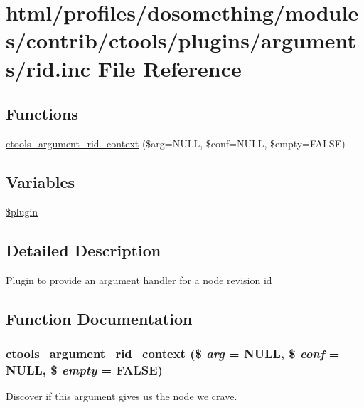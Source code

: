 \hypertarget{rid_8inc}{
\section{html/profiles/dosomething/modules/contrib/ctools/plugins/arguments/rid.inc File Reference}
\label{rid_8inc}
}
\subsection*{Functions}
\begin{DoxyCompactItemize}
\item 
\hyperlink{rid_8inc_a6d6d87b8d7fd2ef4240904fb796906dd}{ctools\_\-argument\_\-rid\_\-context} (\$arg=NULL, \$conf=NULL, \$empty=FALSE)
\end{DoxyCompactItemize}
\subsection*{Variables}
\begin{DoxyCompactItemize}
\item 
\hyperlink{rid_8inc_ada8a7130088351710bb02ed622d6bf65}{\$plugin}
\end{DoxyCompactItemize}


\subsection{Detailed Description}
Plugin to provide an argument handler for a node revision id 

\subsection{Function Documentation}
\hypertarget{rid_8inc_a6d6d87b8d7fd2ef4240904fb796906dd}{
\subsubsection[{ctools\_\-argument\_\-rid\_\-context}]{\setlength{\rightskip}{0pt plus 5cm}ctools\_\-argument\_\-rid\_\-context (\$ {\em arg} = {\ttfamily NULL}, \/  \$ {\em conf} = {\ttfamily NULL}, \/  \$ {\em empty} = {\ttfamily FALSE})}}
\label{rid_8inc_a6d6d87b8d7fd2ef4240904fb796906dd}
Discover if this argument gives us the node we crave. 

